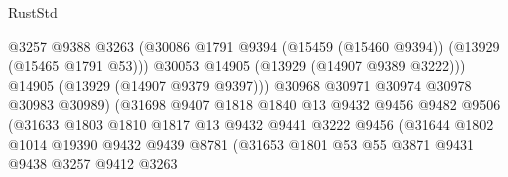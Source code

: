 \begin{lexlean}{RustStd}
\begin{coremodule}
                                          @3257
                                          @9388
                                          @3263
                                          (@30086
                                            @1791
                                            @9394
                                            (@15459 (@15460 @9394))
                                            (@13929 (@15465 @1791 @53)))
                                          @30053
                                          @14905
                                          (@13929 (@14907 @9389 @3222)))
                                        @14905
                                        (@13929 (@14907 @9379 @9397)))
                                      @30968
                                      @30971
                                      @30974
                                      @30978
                                      @30983
                                      @30989)
                                    (@31698
                                      @9407
                                      @1818
                                      @1840
                                      @13
                                      @9432
                                      @9456
                                      @9482
                                      @9506
                                      (@31633
                                        @1803
                                        @1810
                                        @1817
                                        @13
                                        @9432
                                        @9441
                                        @3222
                                        @9456
                                        (@31644
                                          @1802
                                          @1014
                                          @19390
                                          @9432
                                          @9439
                                          @8781
                                          (@31653
                                            @1801
                                            @53
                                            @55
                                            @3871
                                            @9431
                                            @9438
                                            @3257
                                            @9412
                                            @3263

\end{coremodule}
\end{lexlean}
